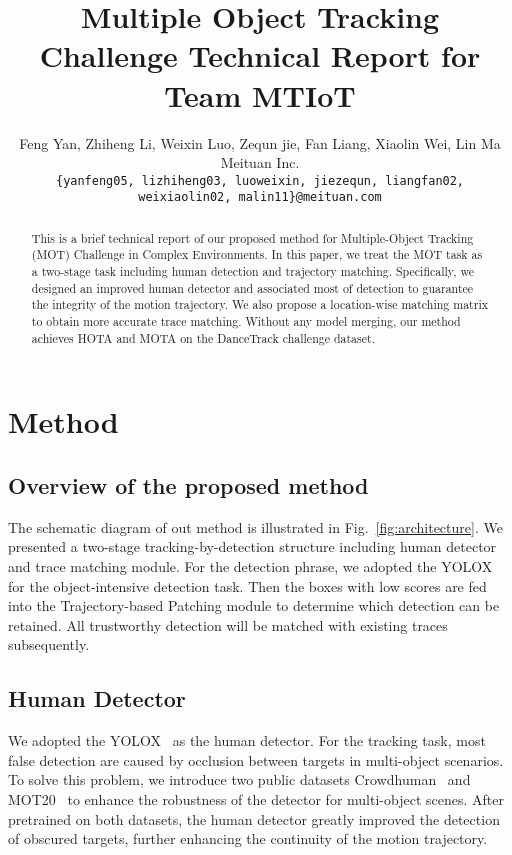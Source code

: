 \documentclass[10pt,twocolumn,letterpaper]{article}
\begin{document}
\title{Multiple Object Tracking Challenge Technical Report for Team MTIoT}

\author{Feng Yan, \enspace Zhiheng Li, \enspace Weixin Luo, \enspace Zequn jie, \enspace Fan Liang, \enspace Xiaolin Wei, \enspace Lin Ma\\
\normalsize Meituan Inc.\\
{\tt\small {\{yanfeng05,
lizhiheng03,
luoweixin,
jiezequn, liangfan02, weixiaolin02,
malin11\}}@meituan.com}}


\maketitle

\begin{abstract}

This is a brief technical report of our proposed method for Multiple-Object Tracking (MOT) Challenge in Complex Environments. In this paper, we treat the MOT task as a two-stage task including human detection and trajectory matching. Specifically, we designed an improved human detector and associated most of detection to guarantee the integrity of the motion trajectory. We also propose a location-wise matching matrix to obtain more accurate trace matching. Without any model merging, our method achieves  HOTA and  MOTA on the DanceTrack challenge dataset. 

\end{abstract}

\section{Method}
\subsection{Overview of the proposed method}

The schematic diagram of out method is illustrated in Fig.~\ref{fig:architecture}. We presented a two-stage tracking-by-detection structure including human detector and trace matching module. For the detection phrase, we adopted the YOLOX~\cite{ge2021yolox} for the object-intensive detection task. Then the boxes with low scores are fed into the Trajectory-based Patching module to determine which 
detection can be retained. All trustworthy detection will be matched with existing traces subsequently.

\subsection{Human Detector}
We adopted the YOLOX~\cite{ge2021yolox} as the human detector. For the tracking task, most false detection are caused by occlusion between targets in multi-object scenarios. To solve this problem, we introduce two public datasets Crowdhuman~\cite{shao2018crowdhuman} and MOT20~\cite{dendorfer2020mot20} to enhance the robustness of the detector for multi-object scenes. After pretrained on both datasets, the human detector greatly improved the detection of obscured targets, further enhancing the continuity of the motion trajectory.
\end{document}
